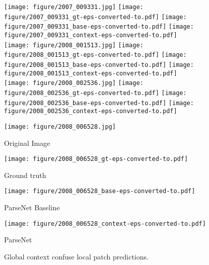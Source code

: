 \documentclass{article} \usepackage{iclr2016_conference}
\begin{document}
\begin{figure}
	\centering
	\texttt{[image: figure/2007\_009331.jpg]}
	\texttt{[image: figure/2007\_009331\_gt-eps-converted-to.pdf]}
	\texttt{[image: figure/2007\_009331\_base-eps-converted-to.pdf]}
	\texttt{[image: figure/2007\_009331\_context-eps-converted-to.pdf]}\\
	\texttt{[image: figure/2008\_001513.jpg]}
	\texttt{[image: figure/2008\_001513\_gt-eps-converted-to.pdf]}
	\texttt{[image: figure/2008\_001513\_base-eps-converted-to.pdf]}
	\texttt{[image: figure/2008\_001513\_context-eps-converted-to.pdf]}\\
	\texttt{[image: figure/2008\_002536.jpg]}
	\texttt{[image: figure/2008\_002536\_gt-eps-converted-to.pdf]}
	\texttt{[image: figure/2008\_002536\_base-eps-converted-to.pdf]}
	\texttt{[image: figure/2008\_002536\_context-eps-converted-to.pdf]}\\
	\begin{subtable}[b]{0.24\linewidth}
		\texttt{[image: figure/2008\_006528.jpg]}
		\caption{Original Image}
	\end{subtable}
	\begin{subtable}[b]{0.24\linewidth}
		\texttt{[image: figure/2008\_006528\_gt-eps-converted-to.pdf]}
		\caption{Ground truth}
	\end{subtable}
	\begin{subtable}[b]{0.24\linewidth}
		\texttt{[image: figure/2008\_006528\_base-eps-converted-to.pdf]}
		\caption{ParseNet Baseline}
	\end{subtable}
	\begin{subtable}[b]{0.24\linewidth}
		\texttt{[image: figure/2008\_006528\_context-eps-converted-to.pdf]}
		\caption{ParseNet}
	\end{subtable}
	\caption{Global context confuse local patch predictions.}
	\label{fig:globalcontextconfuse}
\end{figure}
\end{document}
